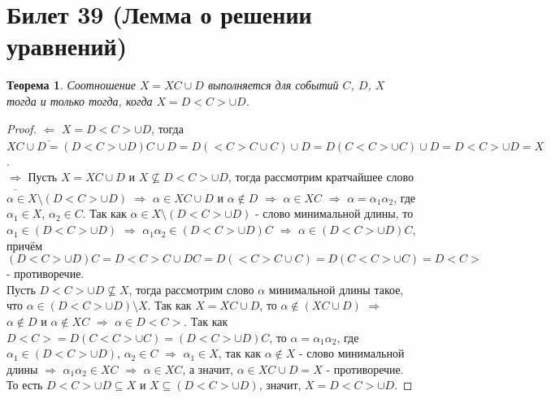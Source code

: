 \documentclass[a4paper, 12pt]{article}
\theoremstyle{definition}
\theoremstyle{plain}
\newtheorem*{theorem}{Теорема}
\theoremstyle{remark}
\begin{document}
  \section{Билет 39 (Лемма о решении уравнений)}
  \begin{theorem}
    Соотношение $X=XC\cup D$ выполняется для событий $C$, $D$, $X$ тогда и только тогда, когда $X=D<C>\cup D$.
  \end{theorem}
  \begin{proof}
    $\underline{\Longleftarrow}$ $X=D<C>\cup D$, тогда $XC\cup D=(D<C>\cup D)C\cup D=D(<C>C\cup C)\cup D=D(C<C>\cup C)\cup D=D<C>\cup D=X$.\\
    $\underline{\Longrightarrow}$ Пусть $X=XC\cup D$ и $X\nsubseteq D<C>\cup D$, тогда рассмотрим кратчайшее слово $\alpha\in X\setminus(D<C>\cup D)$ $\Longrightarrow$ $\alpha\in XC\cup D$ и $\alpha\notin D$ $\Longrightarrow$ $\alpha\in XC$ $\Longrightarrow$ $\alpha=\alpha_1\alpha_2$, где $\alpha_1\in X$, $\alpha_2\in C$. Так как $\alpha\in X\setminus(D<C>\cup D)$ - слово минимальной длины, то $\alpha_1\in (D<C>\cup D)$ $\Longrightarrow$ $\alpha_1\alpha_2\in (D<C>\cup D)C$ $\Longrightarrow$ $\alpha\in (D<C>\cup D)C$, причём $(D<C>\cup D)C=D<C>C\cup DC=D(<C>C\cup C)=D(C<C>\cup C)=D<C>$ - противоречие.\\
    Пусть $D<C>\cup D\nsubseteq X$, тогда рассмотрим слово $\alpha$ минимальной длины такое, что $\alpha\in(D<C>\cup D)\setminus X$. Так как $X=XC\cup D$, то $\alpha\notin(XC\cup D)$ $\Longrightarrow$ $\alpha\notin D$ и $\alpha\notin XC$ $\Longrightarrow$ $\alpha\in D<C>$. Так как $D<C>=D(C<C>\cup C)=(D<C>\cup D)C$, то $\alpha=\alpha_1\alpha_2$, где $\alpha_1\in (D<C>\cup D)$, $\alpha_2\in C$ $\Longrightarrow$ $\alpha_1\in X$, так как $\alpha\notin X$ - слово минимальной длины $\Longrightarrow$ $\alpha_1\alpha_2\in XC$ $\Longrightarrow$ $\alpha\in XC$, а значит, $\alpha\in XC\cup D=X$ - противоречие.\\
    То есть $D<C>\cup D\subseteq X$ и $X\subseteq(D<C>\cup D)$, значит, $X=D<C>\cup D$.
  \end{proof}
\end{document}
